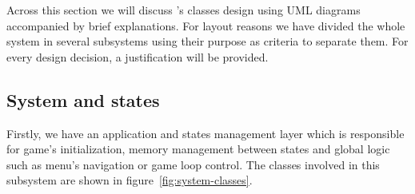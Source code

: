 
Across this section we will discuss \game's classes design using UML diagrams \cite{larm02}
accompanied by brief explanations. For layout reasons we have divided the whole
system in several subsystems using their purpose as criteria to separate them.
For every design decision, a justification will be provided.\\

\subsection{System and states}
\label{sec:design-system}

Firstly, we have an application and states management layer which is responsible for
game's initialization, memory management between states and global logic such as
menu's navigation or game loop control. The classes involved in this subsystem are
shown in figure~\ref{fig:system-classes}.


